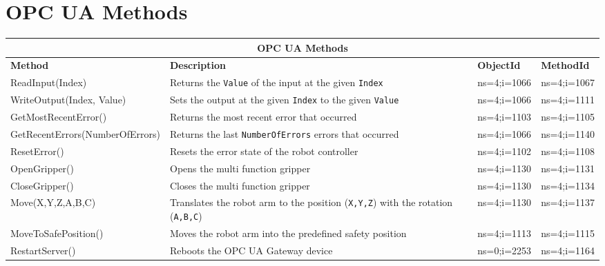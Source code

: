 \documentclass{article}
\begin{document}
\section{OPC UA Methods}
\begin{center}
	\setlength\extrarowheight{4pt}
	\small
	\begin{tabularx}{\textwidth}{|p{5cm}|p{4.5cm}|X|X|}
		\hline
		\multicolumn{4}{|c|}{\bf \color{black} \large OPC UA Methods}\\
		\hline\hline
		\bf Method &\bf Description & \bf ObjectId & \bf MethodId\\
		\hline\hline
		ReadInput(Index) & Returns the \texttt{Value} of the input at the given \texttt{Index}& ns=4;i=1066& ns=4;i=1067\\
		\hline
		WriteOutput(Index, Value) & Sets the output at the given \texttt{Index} to the given \texttt{Value}& ns=4;i=1066 & ns=4;i=1111\\
		\hline
		GetMostRecentError() & Returns the most recent error that occurred & ns=4;i=1103 & ns=4;i=1105\\
		\hline
		GetRecentErrors(NumberOfErrors) & Returns the last \texttt{NumberOfErrors} errors that occurred& ns=4;i=1066 & ns=4;i=1140\\
		\hline
		ResetError() & Resets the error state of the robot controller& ns=4;i=1102 & ns=4;i=1108\\
		\hline
		OpenGripper() & Opens the multi function gripper& ns=4;i=1130 & ns=4;i=1131\\
		\hline
		CloseGripper() & Closes the multi function gripper& ns=4;i=1130& ns=4;i=1134\\
		\hline
		Move(X,Y,Z,A,B,C) & Translates the robot arm to the position (\texttt{X,Y,Z}) with the rotation (\texttt{A,B,C})& ns=4;i=1130 & ns=4;i=1137\\
		\hline
		MoveToSafePosition() & Moves the robot arm into the predefined safety position & ns=4;i=1113&ns=4;i=1115\\
		\hline
		RestartServer() & Reboots the OPC UA Gateway device & ns=0;i=2253& ns=4;i=1164\\
		\hline
	\end{tabularx}
\end{center}
\end{document}
